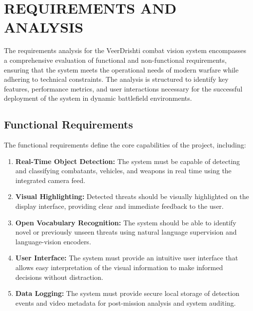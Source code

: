 \chapter{REQUIREMENTS AND ANALYSIS}\label{ch:requirements}
The requirements analysis for the VeerDrishti combat vision system encompasses a comprehensive
evaluation of functional and non-functional requirements, ensuring that the system meets the
operational needs of modern warfare while adhering to technical constraints. The analysis is
structured to identify key features, performance metrics, and user interactions necessary for the
successful deployment of the system in dynamic battlefield environments.

\section{Functional Requirements}\label{sec:functional}
The functional requirements define the core capabilities of the project, including:
\begin{enumerate}[label=\roman*.]
  \item \textbf{Real-Time Object Detection:} The system must be capable of detecting and classifying
    combatants, vehicles, and weapons in real time using the integrated camera feed.
  \item \textbf{Visual Highlighting:} Detected threats should be visually highlighted on the display
    interface, providing clear and immediate feedback to the user.
  \item \textbf{Open Vocabulary Recognition:} The system should be able to identify novel or
    previously unseen threats using natural language supervision and language-vision encoders.
  \item \textbf{User Interface:} The system must provide an intuitive user interface that allows
    easy interpretation of the visual information to make informed decisions without distraction.
  \item \textbf{Data Logging:} The system must provide secure local storage of detection events and
    video metadata for post-mission analysis and system auditing.
  \label{end:functional}
\end{enumerate}
